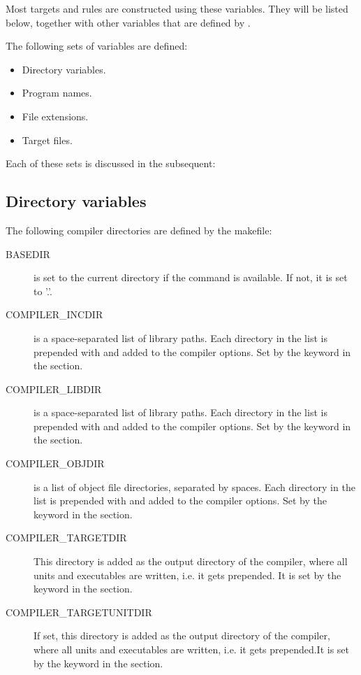 {Most targets and rules are constructed using these variables. They will be
listed below, together with other variables that are defined by \fpcmake{}.

The following sets of variables are defined:
\begin{itemize}
\item Directory variables.
\item Program names.
\item File extensions.
\item Target files.
\end{itemize}
Each of these sets is discussed in the subsequent:

\subsection{Directory variables}

The following compiler directories are defined by the makefile:

\begin{description}
\item[BASEDIR] is set to the current directory if the  command is
available. If not, it is set to '.'.

\item[COMPILER\_INCDIR] is a space-separated list of library paths. Each
directory in the list is prepended with  and added to the
compiler options. Set by the  keyword in the  section.

\item[COMPILER\_LIBDIR] is a space-separated list of library paths. Each
directory in the list is prepended with  and added to the 
compiler options. Set by the  keyword in the  section.

\item[COMPILER\_OBJDIR] is a list of object file directories, separated by
 spaces. Each directory in the list is prepended with  and
added to the compiler options.
Set by the  keyword in the  section.

\item[COMPILER\_TARGETDIR] This directory is added as the output directory of
the compiler, where all units and executables are written, i.e. it gets
 prepended. It is set by the  keyword in the
 section.

\item[COMPILER\_TARGETUNITDIR] If set, this directory is added as the output directory of
the compiler, where all units and executables are written, i.e. it gets
 prepended.It is set by the  keyword in the
 section.


\end{description}}
